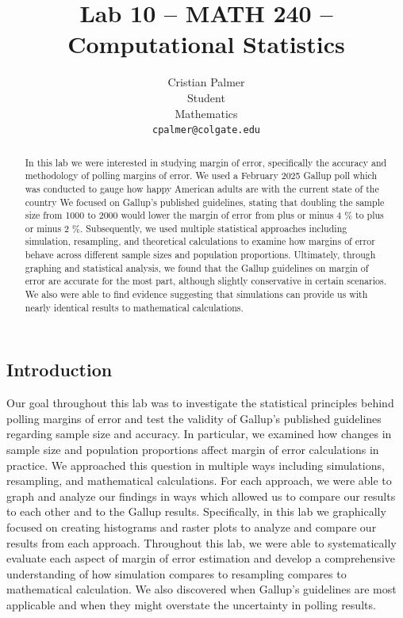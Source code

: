 \documentclass{article}\usepackage[]{graphicx}\usepackage[]{xcolor}
\begin{document}
\vspace{-1in}
\title{Lab 10 -- MATH 240 -- Computational Statistics}

\author{
  Cristian Palmer \\
  Student \\
  Mathematics  \\
  {\tt cpalmer@colgate.edu}
}

\date{}

\maketitle

\begin{multicols}{2}
\begin{abstract}
In this lab we were interested in studying margin of error, specifically the accuracy and methodology of polling margins of error. We used a February 2025 Gallup poll which was conducted to gauge how happy American adults are with the current state of the country We focused on Gallup's published guidelines, stating that doubling the sample size from 1000 to 2000 would lower the margin of error from plus or minus 4 \% to plus or minus 2 \%. Subsequently, we used multiple statistical approaches including simulation, resampling, and theoretical calculations to examine how margins of error behave across different sample sizes and population proportions. Ultimately, through graphing and statistical analysis, we found that the Gallup guidelines on margin of error are accurate for the most part, although slightly conservative in certain scenarios. We also were able to find evidence suggesting that simulations can provide us with nearly identical results to mathematical calculations.

\end{abstract}

\section{Introduction}
Our goal throughout this lab was to investigate the statistical principles behind polling margins of error and test the validity of Gallup's published guidelines regarding sample size and accuracy. In particular, we examined how changes in sample size and population proportions affect margin of error calculations in practice. We approached this question in multiple ways including simulations, resampling, and mathematical calculations. For each approach, we were able to graph and analyze our findings in ways which allowed us to compare our results to each other and to the Gallup results. Specifically, in this lab we graphically focused on creating histograms and raster plots to analyze and compare our results from each approach. Throughout this lab, we were able to systematically evaluate each aspect of margin of error estimation and develop a comprehensive understanding of how simulation compares to resampling compares to mathematical calculation. We also discovered when Gallup's guidelines are most applicable and when they might overstate the uncertainty in polling results. 


\end{multicols}
\end{document}

